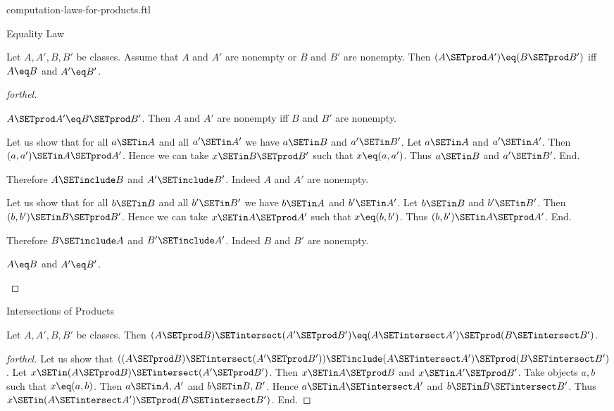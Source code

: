\documentclass{naproche-library}
\begin{document}
\begin{smodule}[title=Computation Laws for Cartesian Products]{computation-laws-for-products.ftl}
\begin{sfragment}{Equality Law}
  \begin{proposition}[forthel,id=FOUNDATIONS_05_2677218429894656]
    Let $A, A', B, B'$ be classes.
    Assume that $A$ and $A'$ are nonempty or $B$ and $B'$ are nonempty.
    Then $(A \SETprod A') \eq (B \SETprod B')$ iff $A \eq B$ and $A' \eq B'$.
  \end{proposition}
  \begin{proof}[forthel]
    \begin{case}{$A \SETprod A' \eq B \SETprod B'$.}
      Then $A$ and $A'$ are nonempty iff $B$ and $B'$ are nonempty.

      Let us show that for all $a \SETin A$ and all $a' \SETin A'$ we have $a \SETin B$ and $a' \SETin B'$.
        Let $a \SETin A$ and $a' \SETin A'$.
        Then $(a, a') \SETin A \SETprod A'$.
        Hence we can take $x \SETin B \SETprod B'$ such that $x \eq (a, a')$.
        Thus $a \SETin B$ and $a' \SETin B'$.
      End.

      Therefore $A \SETinclude B$ and $A' \SETinclude B'$.
      Indeed $A$ and $A'$ are nonempty.

      Let us show that for all $b \SETin B$ and all $b' \SETin B'$ we have $b \SETin A$ and $b' \SETin A'$.
        Let $b \SETin B$ and $b' \SETin B'$.
        Then $(b, b') \SETin B \SETprod B'$.
        Hence we can take $x \SETin A \SETprod A'$ such that $x \eq (b, b')$.
        Thus $(b, b') \SETin A \SETprod A'$.
      End.

      Therefore $B \SETinclude A$ and $B' \SETinclude A'$.
      Indeed $B$ and $B'$ are nonempty.
    \end{case}

    \begin{case}{$A \eq B$ and $A' \eq B'$.} \end{case}
  \end{proof}
\end{sfragment}

\begin{sfragment}{Intersections of Products}
  \begin{proposition}[forthel,id=FOUNDATIONS_05_4154592050806784]
    Let $A, A', B, B'$ be classes.
    Then $(A \SETprod B) \SETintersect (A' \SETprod B') \eq (A \SETintersect A') \SETprod (B \SETintersect B')$.
  \end{proposition}
  \begin{proof}[forthel]
    Let us show that $((A \SETprod B) \SETintersect (A' \SETprod B')) \SETinclude (A \SETintersect A') \SETprod (B \SETintersect B')$. %
      Let $x \SETin (A \SETprod B) \SETintersect (A' \SETprod B')$.
      Then $x \SETin A \SETprod B$ and $x \SETin A' \SETprod B'$.
      Take objects $a, b$ such that $x \eq (a, b)$.
      Then $a \SETin A, A'$ and $b \SETin B, B'$.
      Hence $a \SETin A \SETintersect A'$ and $b \SETin B \SETintersect B'$.
      Thus $x \SETin (A \SETintersect A') \SETprod (B \SETintersect B')$.
    End.


\end{proof}
\end{sfragment}
\end{smodule}
\end{document}
